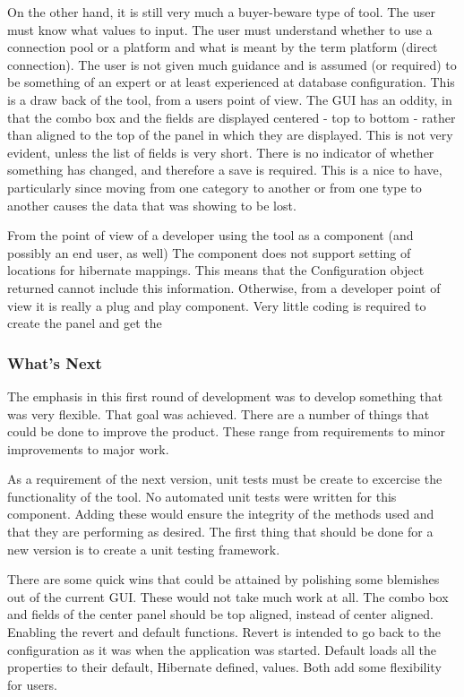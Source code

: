 On the other hand, it is still very much a buyer-beware type of tool. The user must know what values to input. The user must understand whether to use a connection pool or a platform and what is meant by the term platform (direct connection). The user is not given much guidance and is assumed (or required) to be something of an expert or at least experienced at database configuration. This is a draw back of the tool, from a users point of view. The GUI has an oddity, in that the combo box and the fields are displayed centered - top to bottom - rather than aligned to the top of the panel in which they are displayed. This is not very evident, unless the list of fields is very short. There is no indicator of whether something has changed, and therefore a save is required. This is a nice to have, particularly since moving from one category to another or from one type to another causes the data that was showing to be lost.

From the point of view of a developer using the tool as a component (and possibly an end user, as well) The component does not support setting of locations for hibernate mappings. This means that the Configuration object returned cannot include this information. Otherwise, from a developer point of view it is really a plug and play component. Very little coding is required to create the panel and get the 


\subsubsection{What's Next}
The emphasis in this first round of development was to develop something that was very flexible. That goal was achieved. There are a number of things that could be done to improve the product. These range from requirements to minor improvements to major work.

As a requirement of the next version, unit tests must be create to excercise the functionality of the tool. No automated unit tests were written for this component. Adding these would ensure the integrity of the methods used and that they are performing as desired. The first thing that should be done for a new version is to create a unit testing framework. 

There are some quick wins that could be attained by polishing some blemishes out of the current GUI. These would not take much work at all. The combo box and fields of the center panel should be top aligned, instead of center aligned. Enabling the revert and default functions. Revert is intended to go back to the configuration as it was when the application was started. Default loads all the properties to their default, Hibernate defined, values. Both add some flexibility for users.

